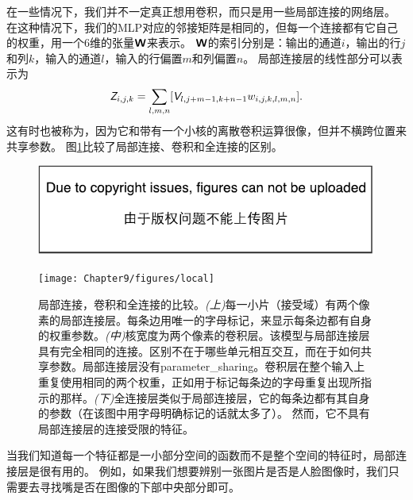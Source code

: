 在一些情况下，我们并不一定真正想用卷积，而只是用一些局部连接的网络层\citep{LeCun86,LeCun89a}。
在这种情况下，我们的\gls{MLP}对应的邻接矩阵是相同的，但每一个连接都有它自己的权重，用一个6维的张量$\textsf{\textbf{W}}$来表示。
$\textsf{\textbf{W}}$的索引分别是：输出的通道$i$，输出的行$j$和列$k$，输入的通道$l$，输入的行偏置$m$和列偏置$n$。
局部连接层的线性部分可以表示为
\begin{equation}
\TEZ_{i,j,k} = \sum_{l,m,n} [\TEV_{l, j+m-1, k+n-1} w_{i, j, k, l, m, n}]. %
\end{equation}
这有时也被称为，因为它和带有一个小核的离散卷积运算很像，但并不横跨位置来共享参数。
图\ref{fig:chap9_local}比较了局部连接、卷积和全连接的区别。
\begin{figure}[!htb]
\ifOpenSource
\centerline{\includegraphics{figure.pdf}}
\else
\centerline{\texttt{[image: Chapter9/figures/local]}}
\fi
\caption{局部连接，卷积和全连接的比较。\emph{(上)}每一小片（接受域）有两个像素的局部连接层。每条边用唯一的字母标记，来显示每条边都有自身的权重参数。\emph{(中)}核宽度为两个像素的卷积层。该模型与局部连接层具有完全相同的连接。区别不在于哪些单元相互交互，而在于如何共享参数。局部连接层没有\gls{parameter_sharing}。卷积层在整个输入上重复使用相同的两个权重，正如用于标记每条边的字母重复出现所指示的那样。\emph{(下)}全连接层类似于局部连接层，它的每条边都有其自身的参数（在该图中用字母明确标记的话就太多了）。 然而，它不具有局部连接层的连接受限的特征。}
\label{fig:chap9_local}
\end{figure}
 
 
当我们知道每一个特征都是一小部分空间的函数而不是整个空间的特征时，局部连接层是很有用的。
例如，如果我们想要辨别一张图片是否是人脸图像时，我们只需要去寻找嘴是否在图像的下部中央部分即可。


